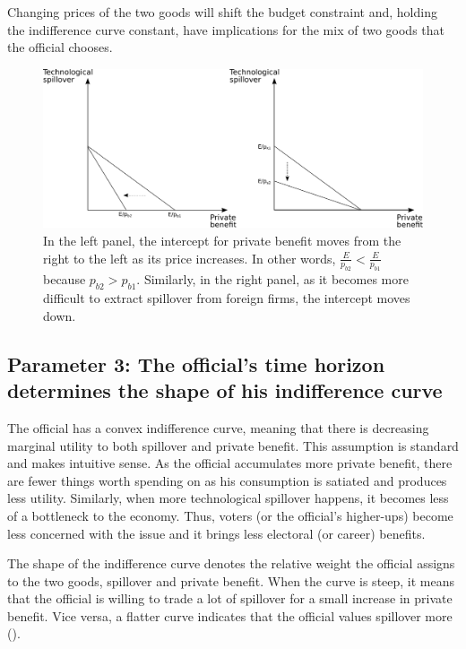 Changing prices of the two goods will shift the budget constraint and, holding the indifference curve constant, have implications for the mix of two goods that the official chooses.

\begin{figure}[!ht]
	\centering
    \includegraphics[width=\textwidth, height=\textheight,keepaspectratio]{../figure/absorptive_capacity}
    \caption{In the left panel, the intercept for private benefit moves from the right to the left as its price increases. In other words, $\frac{E}{p_{b2}} < \frac{E}{p_{b1}}$ because $p_{b2} > p_{b1}$. Similarly, in the right panel, as it becomes more difficult to extract spillover from foreign firms, the intercept moves down.}
    \label{fig:relative_price}
\end{figure}

\subsection{Parameter 3: The official's time horizon determines the shape of his indifference curve}

The official has a convex indifference curve, meaning that there is decreasing marginal utility to both spillover and private benefit. This assumption is standard and makes intuitive sense. As the official accumulates more private benefit, there are fewer things worth spending on as his consumption is satiated and produces less utility. Similarly, when more technological spillover happens, it becomes less of a bottleneck to the economy. Thus, voters (or the official's higher-ups) become less concerned with the issue and it brings less electoral (or career) benefits.

The shape of the indifference curve denotes the relative weight the official assigns to the two goods, spillover and private benefit. When the curve is steep, it means that the official is willing to trade a lot of spillover for a small increase in private benefit. Vice versa, a flatter curve indicates that the official values spillover more ().

